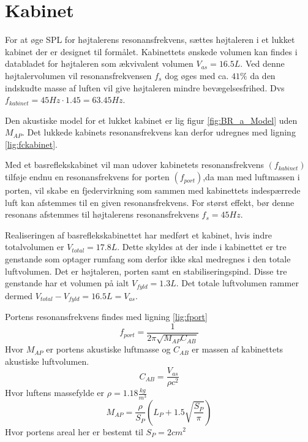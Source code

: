\section{Kabinet}

For at øge SPL for højtalerens resonansfrekvens, sættes højtaleren i et lukket kabinet der er designet til formålet.
Kabinettets ønskede volumen kan findes i databladet for højtaleren\cite{FW168} som ækvivalent volumen $V_{as} = 16.5L$. Ved denne højtalervolumen vil resonansfrekvensen $f_s$ dog øges med ca. $41\%$ da den indskudte masse af luften vil give højtaleren mindre bevægelsesfrihed. Dvs $f_{kabinet}=45Hz\cdot1.45=63.45Hz$. 

Den akustiske model for et lukket kabinet er lig figur \ref{fig:BR_a_Model} uden $M_{AP}$. Det lukkede kabinets resonansfrekvens kan derfor udregnes med ligning \ref{lig:fckabinet}.

Med et basreflekskabinet vil man udover kabinetets resonansfrekvens $(f_{kabinet})$ tilføje endnu en resonansfrekvens for porten $(f_{port})$,da man med luftmassen i porten, vil skabe en fjedervirkning som sammen med kabinettets indespærrede luft kan afstemmes til en given resonansfrekvens. For størst effekt, bør denne resonans afstemmes til højtalerens resonansfrekvens $f_s = 45Hz$.

Realiseringen af basreflekskabinettet har medført et kabinet, hvis indre totalvolumen er $V_{total}=17.8L$. Dette skyldes at der inde i kabinettet er tre genstande som optager rumfang som derfor ikke skal medregnes i den totale luftvolumen. Det er højtaleren, porten samt en stabiliseringspind. Disse tre genstande har et volumen på ialt $V_{fyld}=1.3L$. Det totale luftvolumen rammer dermed $V_{total}-V_{fyld}=16.5L=V_{as}$.

Portens resonansfrekvens findes med ligning \ref{lig:fport}
\begin{equation}\label{lig:fport}
f_{port}=\frac{1}{2 \pi \sqrt{M_{AP} C_{AB}}}
\end{equation}
Hvor $M_{AP}$ er portens akustiske luftmasse og $C_{AB}$ er massen af kabinettets akustiske luftvolumen.
\begin{equation}\label{lig:CAB}
C_{AB}=\frac{V_{as}}{\rho c^2}
	\end{equation}
	Hvor luftens massefylde er $\rho=1.18 \frac{kg}{m^3}$ 
\begin{equation}\label{lig:MAP}
M_{AP}=\frac{\rho}{S_P} (L_P+1.5\sqrt{\frac{S_P}{\pi}})
\end{equation}	
Hvor portens areal her er bestemt til $S_P=2cm^2$

